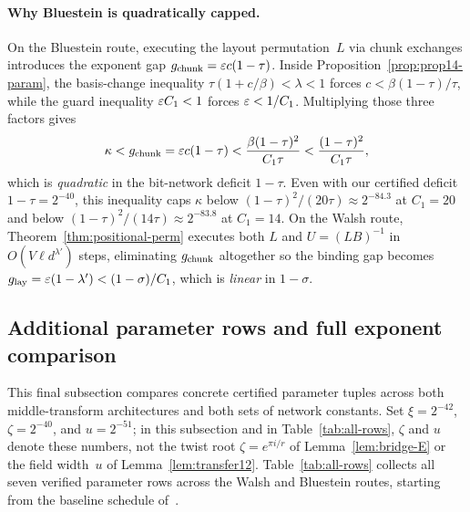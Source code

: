 \paragraph{Why Bluestein is quadratically capped.}
On the Bluestein route, executing the layout permutation~$L$ via chunk exchanges introduces the exponent gap $g_{\rm chunk}=\varepsilon c(1-\tau)$. Inside Proposition~\ref{prop:prop14-param}, the basis-change inequality $\tau(1+c/\beta)<\lambda<1$ forces $c<\beta(1-\tau)/\tau$, while the guard inequality $\varepsilon C_1<1$ forces $\varepsilon<1/C_1$. Multiplying those three factors gives
\begin{equation}\label{eq:old-bottleneck}
  \kappa<g_{\rm chunk}=\varepsilon c(1-\tau)<\frac{\beta(1-\tau)^2}{C_1\tau}<\frac{(1-\tau)^2}{C_1\tau},
\end{equation}
which is \emph{quadratic} in the bit-network deficit $1-\tau$. Even with our certified deficit $1-\tau=2^{-40}$, this inequality caps $\kappa$ below $(1-\tau)^2/(20\tau)\approx2^{-84.3}$ at $C_1=20$ and below $(1-\tau)^2/(14\tau)\approx2^{-83.8}$ at $C_1=14$. On the Walsh route, Theorem~\ref{thm:positional-perm} executes both $L$ and $U=(LB)^{-1}$ in $O(V\ell d^{\lambda'})$ steps, eliminating $g_{\rm chunk}$ altogether so the binding gap becomes $g_{\rm lay}=\varepsilon(1-\lambda')<(1-\sigma)/C_1$, which is \emph{linear} in $1-\sigma$.

\subsection{Additional parameter rows and full exponent comparison}

This final subsection compares concrete certified parameter tuples across both middle-transform architectures and both sets of network constants. Set $\xi=2^{-42}$, $\zeta=2^{-40}$, and $u=2^{-51}$; in this subsection and in Table~\ref{tab:all-rows}, $\zeta$ and $u$ denote these numbers, not the twist root $\zeta=e^{\pi i/r}$ of Lemma~\ref{lem:bridge-E} or the field width~$u$ of Lemma~\ref{lem:transfer12}. Table~\ref{tab:all-rows} collects all seven verified parameter rows across the Walsh and Bluestein routes, starting from the baseline schedule of~\cite[(38)]{OAI26}.

